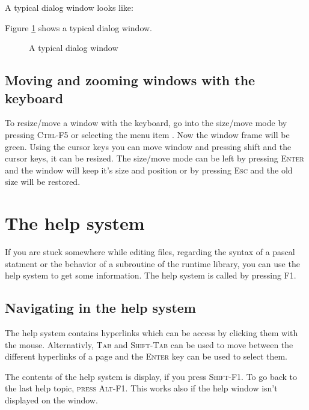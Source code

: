 \begin{htmlonly}
A typical dialog window looks like:
\end{htmlonly}
\begin{latexonly}
Figure \ref{fig:idedlg} shows a typical dialog window.
\begin{figure}
\caption{A typical dialog window}
\label{fig:idedlg}
\ifpdf
{}
\else
{}
\fi
\end{figure}
\end{latexonly}

\subsection{Moving and zooming windows with the keyboard}
\label{ide:keyboardwindow}
To resize/move a window with the keyboard, go into the size/move mode
by pressing \textsc{Ctrl-F5} or selecting the menu item
. Now the window frame will be green. Using the
cursor keys you can move window and pressing shift and the cursor
keys, it can be resized. The size/move mode can be left by pressing
\textsc{Enter} and the window will keep it's size and position
or by pressing \textsc{Esc} and the old size will be restored.

\section{The help system}
If you are stuck somewhere while editing files, regarding the syntax
of a pascal statment or the behavior of a subroutine of the runtime
library, you can use the help system to get some information. The
help system is called by pressing F1.

\subsection{Navigating in the help system}
The help system contains hyperlinks which can be access by clicking
them with the mouse. Alternativly, \textsc{Tab} and \textsc{Shift-Tab}
can be used to move between the different hyperlinks of a page
and the \textsc{Enter} key can be used to select them.

The contents of the help system is display, if you press \textsc{Shift-F1}.
To go back to the last help topic, \textsc{press Alt-F1}. This works
also if the help window isn't displayed on the window.


